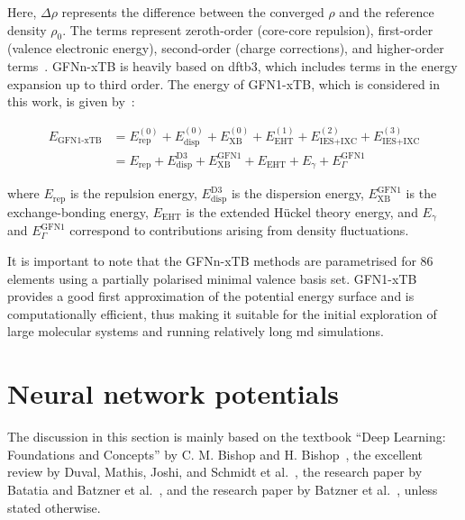 Here, $\Delta \rho$ represents the difference between the converged $\rho$ and the reference density $\rho_0$. The terms represent zeroth-order (core-core repulsion), first-order (valence electronic energy), second-order (charge corrections), and higher-order terms~\citep{jensenIntroductionComputationalChemistry2017}. GFNn-xTB is heavily based on \ac{dftb}3, which includes terms in the energy expansion up to third order. The energy of GFN1-xTB, which is considered in this work, is given by~\citep{bannwarthExtendedTightbindingQuantum2021}:

\begin{equation}
    \begin{aligned}
    E_{\text{GFN1-xTB}} &= E_{\text{rep}}^{(0)} + E_{\text{disp}}^{(0)} + E_{\text{XB}}^{(0)} + E_{\text{EHT}}^{(1)} + E_{\text{IES+IXC}}^{(2)} + E_{\text{IES+IXC}}^{(3)} \\
    &= E_{\text{rep}} + E_{\text{disp}}^{\text{D3}} + E_{\text{XB}}^{\text{GFN1}} + E_{\text{EHT}} + E_{\gamma} + E_{\Gamma}^{\text{GFN1}}
    \end{aligned}
    \label{eq:gfn1xtb_energy}
\end{equation}

where $E_{\text{rep}}$ is the repulsion energy, $E_{\text{disp}}^{\text{D3}}$ is the dispersion energy, $E_{\text{XB}}^{\text{GFN1}}$ is the exchange-bonding energy, $E_{\text{EHT}}$ is the extended H\"uckel theory energy, and $E_\gamma$ and $E_\Gamma^{\text{GFN1}}$ correspond to contributions arising from density fluctuations.

It is important to note that the GFNn-xTB methods are parametrised for 86 elements using a partially polarised minimal valence basis set. GFN1-xTB provides a good first approximation of the potential energy surface and is computationally efficient, thus making it suitable for the initial exploration of large molecular systems and running relatively long \ac{md} simulations.


\section{Neural network potentials}
The discussion in this section is mainly based on the textbook ``Deep Learning: Foundations and Concepts'' by C. M. Bishop and H. Bishop~\citep{bishopDeepLearningFoundations2023}, the excellent review by Duval, Mathis, Joshi, and Schmidt et al.~\citep{duvalHitchhikersGuideGeometric2024}, the research paper by Batatia and Batzner et al.~\citep{batatiaDesignSpaceE3Equivariant2022}, and the research paper by Batzner et al.~\citep{batznerE3equivariantGraphNeural2022}, unless stated otherwise.

